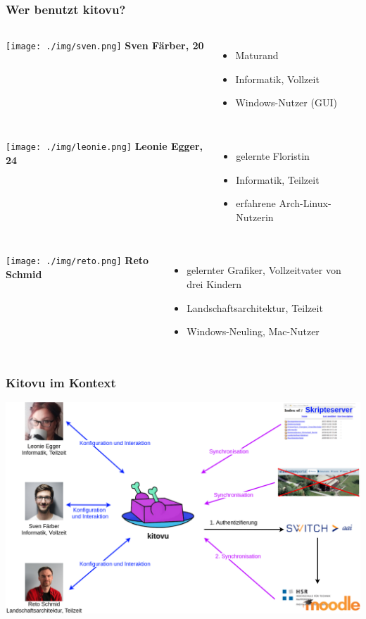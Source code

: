 \documentclass{beamer}
\begin{document}
	\begin{frame}
 	\frametitle{Wer benutzt kitovu?}
	 	\begin{columns}
	 		\texttt{[image: ./img/sven.png]}
			\textbf{Sven Färber, 20}
			\begin{itemize}
				\item Maturand
				\item Informatik, Vollzeit
				\item Windows-Nutzer (GUI)
			\end{itemize}
			
	 	\end{columns} \vspace{1em}
	 	\pause
		\begin{columns}
			\column{.2\textwidth}
			\texttt{[image: ./img/leonie.png]}
			\column{.8\textwidth}
			\textbf{Leonie Egger, 24}
			\begin{itemize}
				\item gelernte Floristin
				\item Informatik, Teilzeit
				\item erfahrene Arch-Linux-Nutzerin
			\end{itemize}
		\end{columns} \vspace{1em}
		\pause
		\begin{columns}
			\texttt{[image: ./img/reto.png]}
			\textbf{Reto Schmid}
		\begin{itemize}
			\item gelernter Grafiker, Vollzeitvater von drei Kindern
			\item Landschaftsarchitektur, Teilzeit
			\item Windows-Neuling, Mac-Nutzer
		\end{itemize}
		
		\end{columns}
	\end{frame}
	
	\begin{frame}
	\frametitle{Kitovu im Kontext}
	\includegraphics[width=\linewidth]{../03_End_of_Elaboration/img/kontextdiagramm.png}
	\end{frame}
	
\end{document}
